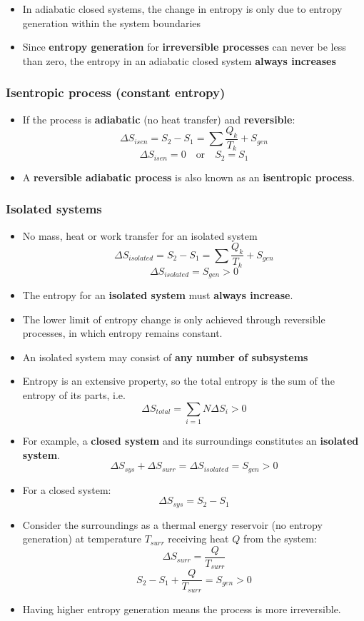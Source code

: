 \documentclass[11pt]{article}
\begin{document}
\begin{itemize}
\item In adiabatic closed systems, the change in entropy is only due to entropy generation within the system boundaries
\item Since \textbf{entropy generation} for \textbf{irreversible processes} can never be less than zero, the entropy in an adiabatic closed system \textbf{always increases}
\end{itemize}
\subsubsection{Isentropic process (constant entropy)}
\label{sec:org2373e82}
\begin{itemize}
\item If the process is \textbf{adiabatic} (no heat transfer) and \textbf{reversible}:
\[\Delta S_{isen} = S_2 - S_1 = \sum \frac{Q_k}{T_k} + S_{gen}\]
\[\Delta S_{isen} = 0 \quad \text{or} \quad S_2 = S_1\]
\item A \textbf{reversible adiabatic process} is also known as an \textbf{isentropic process}.
\end{itemize}
\subsubsection{Isolated systems}
\label{sec:org44bc9a6}
\begin{itemize}
\item No mass, heat or work transfer for an isolated system
\[\Delta S_{isolated} = S_2 - S_1 = \sum \frac{Q_k}{T_k} + S_{gen}\]
\[\Delta S_{isolated} = S_{gen} > 0\]
\item The entropy for an \textbf{isolated system} must \textbf{always increase}.
\item The lower limit of entropy change is only achieved through reversible processes, in which entropy remains constant.
\item An isolated system may consist of \textbf{any number of subsystems}
\item Entropy is an extensive property, so the total entropy is the sum of the entropy of its parts, i.e.
\[\Delta S_{total} = \sum_{i = 1}{N} \Delta S_i > 0\]
\item For example, a \textbf{closed system} and its surroundings constitutes an \textbf{isolated system}.
\[\Delta S_{sys} + \Delta S_{surr} = \Delta S_{isolated} = S_{gen} > 0\]
\item For a closed system:
\[\Delta S_{sys} = S_2 - S_1\]
\item Consider the surroundings as a thermal energy reservoir (no entropy generation) at temperature \(T_{surr}\) receiving heat \(Q\) from the system:
\[\Delta S_{surr} = \frac{Q}{T_{surr}}\]
\[S_2 - S_1 + \frac{Q}{T_{surr}} = S_{gen} > 0\]
\item Having higher entropy generation means the process is more irreversible.
\end{itemize}
\end{document}
